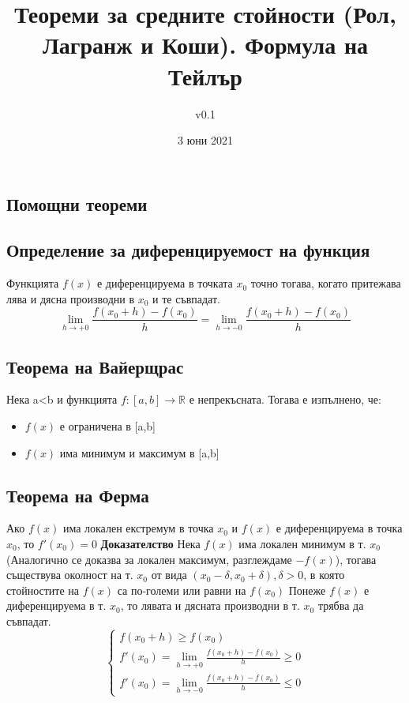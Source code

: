 \documentclass[fleqn,12pt]{article}
\title{Теореми  за  средните  стойности  (Рол,  Лагранж  и  Коши).  Формула  на Тейлър}
\author{v0.1}
\date{3 юни 2021}
\begin{document}
    
\maketitle

\tableofcontents

\begin{flushleft}
    
\section{Помощни теореми}

\subsection{Определение за диференцируемост на функция}
Функцията $f(x)$ е диференцируема в точката $x_0$ точно тогава, когато притежава лява и дясна производни в $x_0$ и те съвпадат.
\[\lim_{h \to +0} \frac{f(x_0 + h)-f(x_0)}{h} = \lim_{h \to -0} \frac{ f(x_0 + h)-f(x_0)}{h}\]

\subsection{Теорема на Вайерщрас}
Нека a<b и функцията $f:[a,b]\rightarrow\mathbb{R}$ е непрекъсната. Тогава е изпълнено, че:
\begin{itemize}
    \item $f(x)$ е ограничена в [a,b]
    \item $f(x)$ има минимум и максимум в [a,b] 
\end{itemize}

\subsection{Теорема на Ферма}
Ако $f(x)$ има локален екстремум в точка $x_0$ и $f(x)$ е диференцируема в точка $x_0$, то $f'(x_0)=0$
\bigbreak
\textbf{Доказателство}
Нека $f(x)$ има локален минимум в т. $x_0$ (Аналогично се доказва за локален максимум, разглеждаме $-f(x)$),
тогава съществува околност на т. $x_0$ от вида $(x_0 - \delta,x_0 + \delta), \delta > 0$, в която стойностите на $f(x)$ са по-големи или равни на $f(x_0)$
Понеже $f(x)$ е диференцируема в т. $x_0$, то лявата и дясната производни в т. $x_0$ трябва да съвпадат.
\[
\begin{cases}
    f(x_0 + h) \geq f(x_0)\\
    f'(x_0) = \lim_{h \to +0} \frac{ f(x_0 + h)-f(x_0)}{h} \geq 0\\
    f'(x_0) = \lim_{h \to -0} \frac{ f(x_0 + h)-f(x_0)}{h} \leq 0
\end{cases}
\]


\end{flushleft}
\end{document}

